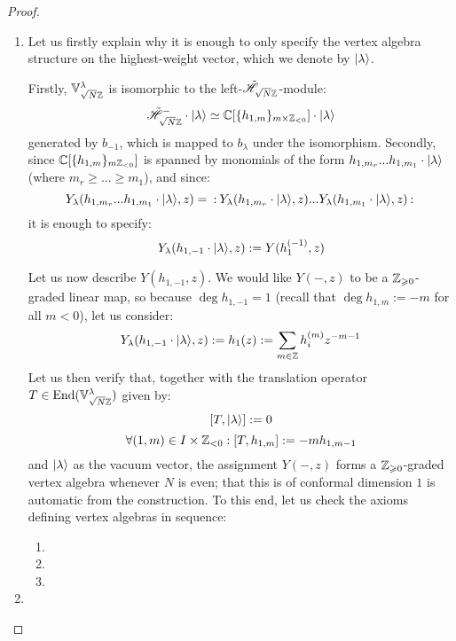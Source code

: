                 \begin{proof}
                    \begin{enumerate}
                        \item Let us firstly explain why it is enough to only specify the vertex algebra structure on the highest-weight vector, which we denote by $\lvert {\lambda} \rangle$.
                        
                        Firstly, $\mathbb{V}_{\sqrt{N} \mathbb{Z}}^{\lambda}$ is isomorphic to the left-$\tilde{\mathscr{H}}_{\sqrt{N} \mathbb{Z}}$-module:
                            $$\tilde{\scrH}_{\sqrt{N} \Z}^- \cdot \ket{\lambda} \cong \bbC[ \{h_{1, m}\}_{m \x \Z_{< 0}} ] \cdot \ket{\lambda}$$
                        generated by $b_{-1}$, which is mapped to $b_{\lambda}$ under the isomorphism. Secondly, since $\mathbb{C}[ \{h_{1, m}\}_{m \mathbb{Z}_{< 0}} ]$ is spanned by monomials of the form $h_{1, m_r} ... h_{1, m_1} \cdot \lvert {\lambda} \rangle$ (where $m_r \geq ... \geq m_1$), and since:
                            $$Y_{\lambda}(h_{1, m_r} ... h_{1, m_1} \cdot \lvert {\lambda} \rangle, z) = \: \mathbf{:} \: { Y_{\lambda}(h_{1, m_r} \cdot \lvert {\lambda} \rangle, z) ... Y_{\lambda}(h_{1, m_1} \cdot \lvert {\lambda} \rangle, z) }  \: \mathbf{:} \:$$
                        it is enough to specify:
                            $$Y_{\lambda}(h_{1, -1} \cdot \lvert {\lambda} \rangle, z) := Y(h_1^{(-1)}, z)$$

                        Let us now describe $Y(h_{1, -1}, z)$. We would like $Y(-, z)$ to be a $\mathbb{Z}_{\geqslant 0}$-graded linear map, so because $\deg h_{1, -1} = 1$ (recall that $\deg h_{1, m} := -m$ for all $m < 0$), let us consider:
                            $$Y_{\lambda}(h_{1, -1} \cdot \lvert {\lambda} \rangle, z) := h_1(z) := \sum_{m \in \mathbb{Z}} h_i^{(m)} z^{-m - 1}$$
                        Let us then verify that, together with the translation operator $T \in \mathrm{End}(\mathbb{V}_{\sqrt{N}\mathbb{Z}}^{\lambda})$ given by:
                            $$[T, \lvert {\lambda} \rangle] := 0$$
                            $$\forall (1, m) \in I \x \Z_{< 0}: [T, h_{1, m}] := -m h_{1, m - 1}$$
                        and $\lvert {\lambda} \rangle$ as the vacuum vector, the assignment $Y(-, z)$ forms a $\mathbb{Z}_{\geqslant 0}$-graded vertex algebra whenever $N$ is even; that this is of conformal dimension $1$ is automatic from the construction. To this end, let us check the axioms defining vertex algebras in sequence:
                        \begin{enumerate}
                            \item 
                            \item 
                            \item 
                        \end{enumerate}
                        \item 
                    \end{enumerate}
                \end{proof}

